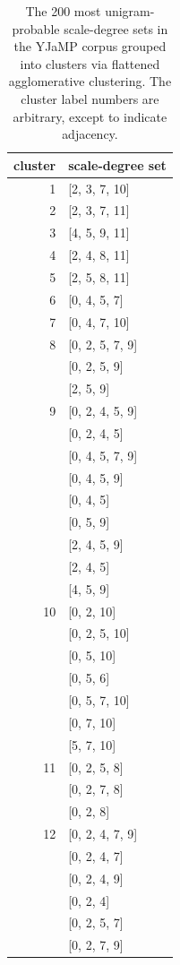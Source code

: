 \begin{table}
	\caption{The 200 most unigram-probable scale-degree sets in the YJaMP corpus grouped into clusters via flattened agglomerative clustering.  The cluster label numbers are arbitrary, except to indicate adjacency.}
	\label{memb}
\begin{multicols}{3}
{\small
\begin{tabular}[t]{r |l }
\hline\hline
cluster & scale-degree set\\ [0.5ex]
\hline
1	&	[2, 3, 7, 10]	\\
2	&	[2, 3, 7, 11]	\\
3	&	[4, 5, 9, 11]	\\
4	&	[2, 4, 8, 11]	\\
5	&	[2, 5, 8, 11]	\\
6	&	[0, 4, 5, 7]	\\
7	&	[0, 4, 7, 10]	\\
8	&	[0, 2, 5, 7, 9]	\\
	&	[0, 2, 5, 9]	\\
	&	[2, 5, 9]	\\
9	&	[0, 2, 4, 5, 9]	\\
	&	[0, 2, 4, 5]	\\
	&	[0, 4, 5, 7, 9]	\\
	&	[0, 4, 5, 9]	\\
	&	[0, 4, 5]	\\
	&	[0, 5, 9]	\\
	&	[2, 4, 5, 9]	\\
	&	[2, 4, 5]	\\
	&	[4, 5, 9]	\\
10	&	[0, 2, 10]	\\
	&	[0, 2, 5, 10]	\\
	&	[0, 5, 10]	\\
	&	[0, 5, 6]	\\
	&	[0, 5, 7, 10]	\\
	&	[0, 7, 10]	\\
	&	[5, 7, 10]	\\
11	&	[0, 2, 5, 8]	\\
	&	[0, 2, 7, 8]	\\
	&	[0, 2, 8]	\\
12	&	[0, 2, 4, 7, 9]	\\
	&	[0, 2, 4, 7]	\\
	&	[0, 2, 4, 9]	\\
	&	[0, 2, 4]	\\
	&	[0, 2, 5, 7]	\\
	&	[0, 2, 7, 9]	\\

\end{tabular}}
\end{multicols}
\end{table}
